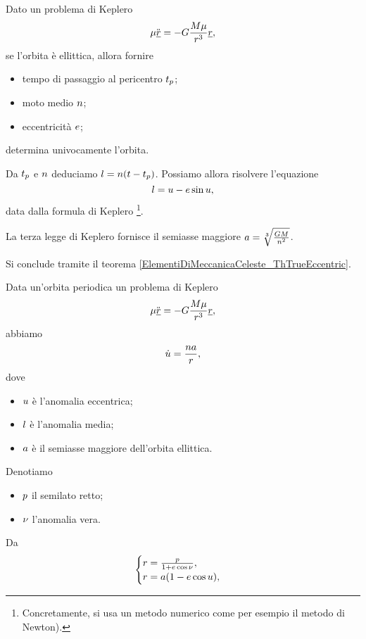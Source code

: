 \begin{Theorem}
	Dato un problema di Keplero
	\[
		\mu \ddot{\underline{r}}
    = - G \frac{M\mu}{r^3}\underline{r},
	\]
  se l'orbita \`e ellittica, allora fornire
  \begin{itemize}
    \item tempo di passaggio al pericentro ${t_p}$;
    \item moto medio $n$;
    \item eccentricit\`a $e$;
  \end{itemize}
  determina univocamente l'orbita.
\end{Theorem}
\Proof Da ${t_p}$ e $n$ deduciamo
$l
= n(t - {t_p})$. Possiamo allora risolvere
l'equazione
\[
	l = u
    - e \sin{u},
\]
data dalla formula di Keplero
\footnote{Concretamente, si usa un metodo numerico come per esempio il
metodo di Newton).}.
\par La terza legge di Keplero fornisce il semiasse maggiore
$a
= \sqrt[3]{\frac{GM}{n^2}}$.
\par Si conclude tramite il teorema
\ref{ElementiDiMeccanicaCeleste_ThTrueEccentric}. \EndProof
\begin{Theorem}
	Data un'orbita periodica un problema di Keplero
	\[
		\mu \ddot{\underline{r}}
    = - G \frac{M\mu}{r^3}\underline{r},
	\]
  abbiamo
  \[
    \dot{u} = \frac{n a}{r},
  \]
  dove
	\begin{itemize}
		\item $u$ \`e l'anomalia eccentrica;
		\item $l$ \`e l'anomalia media;
		\item $a$ \`e il semiasse maggiore dell'orbita
      ellittica.
	\end{itemize}
\end{Theorem}
\Proof Denotiamo
\begin{itemize}
  \item $p$ il semilato retto;
  \item $\nu$ l'anomalia vera.
\end{itemize}
Da
\[
  \begin{cases}
    r = \frac{p}{1 + e \cos{\nu}},\\
    r = a(1 - e \cos{u}),
  \end{cases}
\]
